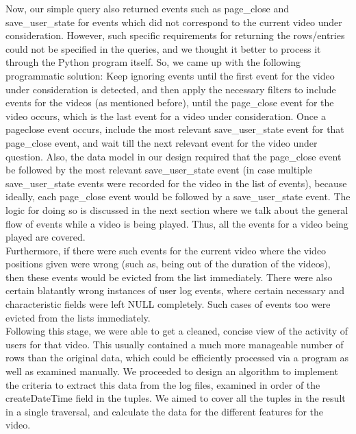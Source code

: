\documentclass[16pt]{report}
\begin{document}
Now, our simple query also returned events such as page\_close and save\_user\_state for events which did not correspond to the current video under consideration. However, such specific requirements for returning the rows/entries could not be specified in the queries, and we thought it better to process it through the Python program itself. So, we came up with the following programmatic solution: Keep ignoring events until the first event for the video under consideration is detected, and then apply the necessary filters to include events for the videos (as mentioned before), until the page\_close event for the video occurs, which is the last event for a video under consideration. Once a pageclose event occurs, include the most relevant save\_user\_state event for that page\_close event, and wait till the next relevant event for the video under question. Also, the data model in our design required that the page\_close event be followed by the most relevant save\_user\_state event (in case multiple save\_user\_state events were recorded for the video in the list of events), because ideally, each page\_close event would be followed by a save\_user\_state event. The logic for doing so is discussed in the next section where we talk about the general flow of events while a video is being played. Thus, all the events for a video being played are covered.    \\


Furthermore, if there were such events for the current video where the video positions given were wrong (such as, being out of the duration of the videos), then these events would be evicted from the list immediately. There were also certain blatantly wrong instances of user log events, where certain necessary and characteristic fields were left NULL completely. Such cases of events too were evicted from the lists immediately.    \\


Following this stage, we were able to get a cleaned, concise view of the activity of users for that video. This usually contained a much more manageable number of rows than the original data, which could be efficiently processed via a program as well as examined manually. We proceeded to design an algorithm to implement the criteria to extract this data from the log files, examined in order of the createDateTime field in the tuples. We aimed to cover all the tuples in the result in a single traversal, and calculate the data for the different features for the video. 
\end{document}
